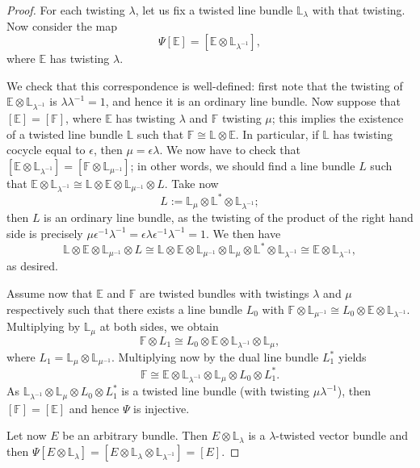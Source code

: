 \begin{proof}
For each twisting $\lambda$, let us fix a twisted line bundle $\mathbb{L}_{\lambda}$ with that twisting. Now consider the map
$$\Psi [\mathbb{E}]=[\mathbb{E}\otimes \mathbb{L}_{\lambda^{-1}}],$$
where $\mathbb{E}$ has twisting $\lambda$.

We check that this correspondence is well-defined: first note that the twisting of $\mathbb{E}\otimes \mathbb{L}_{\lambda^{-1}}$ is $\lambda \lambda^{-1}=1$, and hence it is an ordinary line bundle. Now suppose that $[\mathbb{E}]=[\mathbb{F}]$, where $\mathbb{E}$ has twisting $\lambda$ and $\mathbb{F}$ twisting $\mu$; this implies the existence of a twisted line bundle $\mathbb{L}$ such that $\mathbb{F}\cong \mathbb{L}\otimes \mathbb{E}$. In particular, if $\mathbb{L}$ has twisting cocycle equal to $\epsilon$, then $\mu =\epsilon \lambda$. We now have to check that $[\mathbb{E}\otimes \mathbb{L}_{\lambda^{-1}}]=[\mathbb{F}\otimes \mathbb{L}_{\mu^{-1}}]$; in other words, we should find a line bundle $L$ such that $\mathbb{E}\otimes \mathbb{L}_{\lambda^{-1}}\cong \mathbb{L}\otimes \mathbb{E}\otimes \mathbb{L}_{\mu^{-1}}\otimes L$. Take now
$$L:=\mathbb{L}_\mu \otimes \mathbb{L}^*\otimes \mathbb{L}_{\lambda^{-1}};$$
then $L$ is an ordinary line bundle, as the twisting of the product of the right hand side is precisely $\mu \epsilon^{-1}\lambda^{-1}=\epsilon \lambda \epsilon^{-1}\lambda^{-1}=1$. We then have
$$\mathbb{L}\otimes \mathbb{E}\otimes \mathbb{L}_{\mu^{-1}}\otimes L\cong \mathbb{L}\otimes \mathbb{E}\otimes \mathbb{L}_{\mu^{-1}}\otimes \mathbb{L}_\mu \otimes \mathbb{L}^*\otimes \mathbb{L}_{\lambda^{-1}}\cong \mathbb{E}\otimes \mathbb{L}_{\lambda^{-1}},$$
as desired.

Assume now that $\mathbb{E}$ and $\mathbb{F}$ are twisted bundles with twistings $\lambda$ and $\mu$ respectively such that there exists a line bundle $L_0$ with $\mathbb{F}\otimes \mathbb{L}_{\mu^{-1}}\cong L_0\otimes \mathbb{E}\otimes \mathbb{L}_{\lambda^{-1}}$. Multiplying by $\mathbb{L}_{\mu}$ at both sides, we obtain
$$\mathbb{F}\otimes L_1\cong L_0\otimes \mathbb{E}\otimes \mathbb{L}_{\lambda^{-1}}\otimes \mathbb{L}_{\mu},$$
where $L_1=\mathbb{L}_{\mu}\otimes \mathbb{L}_{\mu^{-1}}$. Multiplying now by the dual line bundle $L_1^*$ yields
$$\mathbb{F}\cong \mathbb{E}\otimes \mathbb{L}_{\lambda^{-1}}\otimes \mathbb{L}_{\mu}\otimes L_0\otimes L_1^*.$$
As $\mathbb{L}_{\lambda^{-1}}\otimes \mathbb{L}_{\mu}\otimes L_0\otimes L_1^*$ is a twisted line bundle (with twisting $\mu \lambda^{-1}$), then $[\mathbb{F}]=[\mathbb{E}]$ and hence $\Psi$ is injective.

Let now $E$ be an arbitrary bundle. Then $E\otimes \mathbb{L}_{\lambda}$ is a $\lambda$-twisted vector bundle and then $\Psi [E\otimes \mathbb{L}_{\lambda}]=[E\otimes \mathbb{L}_{\lambda}\otimes \mathbb{L}_{\lambda^{-1}}]=[E]$.
\end{proof}




